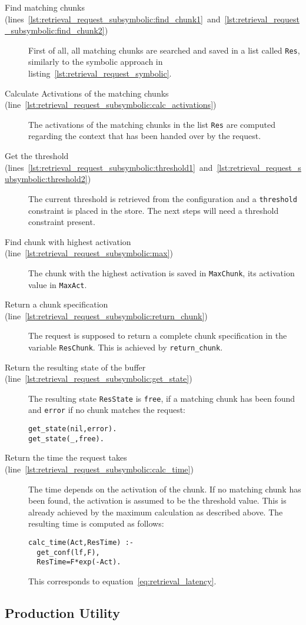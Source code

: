 \begin{description}
 \item[Find matching chunks (lines~\ref{lst:retrieval_request_subsymbolic:find_chunk1}~and~\ref{lst:retrieval_request_subsymbolic:find_chunk2})] First of all, all matching chunks are searched and saved in a list called \verb|Res|, similarly to the symbolic approach in listing~\ref{lst:retrieval_request_symbolic}.
 \item[Calculate Activations of the matching chunks (line~\ref{lst:retrieval_request_subsymbolic:calc_activations})] The activations of the matching chunks in the list \verb|Res| are computed regarding the context that has been handed over by the request.
 \item[Get the threshold (lines~\ref{lst:retrieval_request_subsymbolic:threshold1}~and~\ref{lst:retrieval_request_subsymbolic:threshold2})] The current threshold is retrieved from the configuration and a \verb|threshold| constraint is placed in the store. The next steps will need a threshold constraint present.
 \item[Find chunk with highest activation (line~\ref{lst:retrieval_request_subsymbolic:max})] The chunk with the highest activation is saved in \verb|MaxChunk|, its activation value in \verb|MaxAct|.
 \item[Return a chunk specification (line~\ref{lst:retrieval_request_subsymbolic:return_chunk})] The request is supposed to return a complete chunk specification in the variable \verb|ResChunk|. This is achieved by \verb|return_chunk|.
 \item[Return the resulting state of the buffer (line~\ref{lst:retrieval_request_subsymbolic:get_state})] The resulting state \verb|ResState| is \verb|free|, if a matching chunk has been found and \verb|error| if no chunk matches the request:
 
\begin{lstlisting}
get_state(nil,error).
get_state(_,free).
\end{lstlisting}

 \item[Return the time the request takes (line~\ref{lst:retrieval_request_subsymbolic:calc_time})] The time depends on the activation of the chunk. If no matching chunk has been found, the activation is assumed to be the threshold value. This is already achieved by the maximum calculation as described above. The resulting time is computed as follows:
 
\begin{lstlisting}
calc_time(Act,ResTime) :-
  get_conf(lf,F),
  ResTime=F*exp(-Act). 
\end{lstlisting}

This corresponds to equation~\eqref{eq:retrieval_latency}.
\end{description}

\subsection{Production Utility}

